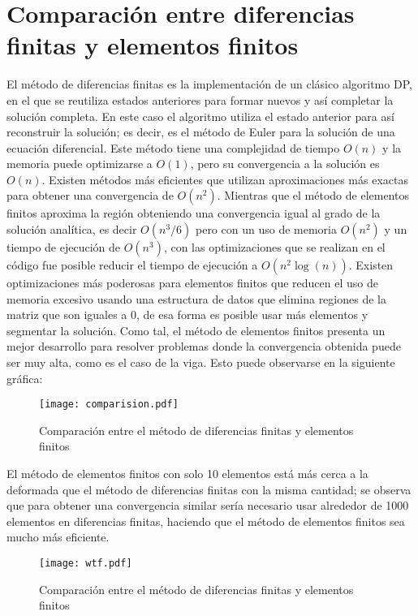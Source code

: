 \documentclass[11pt,a4paper]{article}
\begin{document}
\section*{Comparación entre diferencias finitas y elementos finitos}
El método de diferencias finitas es la implementación de un clásico algoritmo DP, en el que se reutiliza estados anteriores para formar nuevos y así completar la solución completa. En este caso el algoritmo utiliza el estado anterior para así reconstruir la solución; es decir, es el método de Euler para la solución de una ecuación diferencial. Este método tiene una complejidad de tiempo $O(n)$ y la memoria puede optimizarse a $O(1)$, pero su convergencia a la solución es $O(n)$. Existen métodos más eficientes que utilizan aproximaciones más exactas para obtener una convergencia de $O(n^{2})$. Mientras que el método de elementos finitos aproxima la región obteniendo una convergencia igual al grado de la solución analítica, es decir $O(n^{3}/6)$ pero con un uso de memoria $O(n^{2})$ y un tiempo de ejecución de $O(n^{3})$, con las optimizaciones que se realizan en el código fue posible reducir el tiempo de ejecución a $O(n^{2}\log(n))$. Existen optimizaciones más poderosas para elementos finitos que reducen el uso de memoria excesivo usando una estructura de datos \cite{sparse_code} que elimina regiones de la matriz que son iguales a 0, de esa forma es posible usar más elementos y segmentar la solución. Como tal, el método de elementos finitos presenta un mejor desarrollo para resolver problemas donde la convergencia obtenida puede ser muy alta, como es el caso de la viga. Esto puede observarse en la siguiente gráfica:
\begin{figure}[H]
    \centering
    \texttt{[image: comparision.pdf]}
    \caption{Comparación entre el método de diferencias finitas y elementos finitos}
\end{figure}
El método de elementos finitos con solo 10 elementos está más cerca a la deformada que el método de diferencias finitas con la misma cantidad; se observa que para obtener una convergencia similar sería necesario usar alrededor de 1000 elementos en diferencias finitas, haciendo que el método de elementos finitos sea mucho más eficiente.
\begin{figure}[H]
    \centering
    \texttt{[image: wtf.pdf]}
    \caption{Comparación entre el método de diferencias finitas y elementos finitos}
\end{figure}
\end{document}
